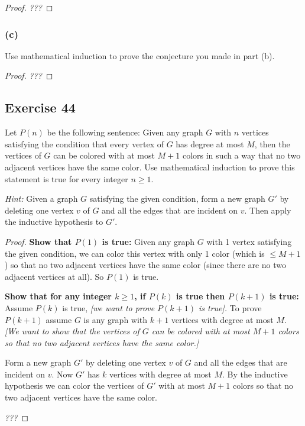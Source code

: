 \documentclass[14pt]{extarticle}
\begin{document}
\begin{proof}
    {\it ???}
\end{proof}

\subsubsection{(c)}
Use mathematical induction to prove the conjecture you made in part (b).

\begin{proof}
    {\it ???}
\end{proof}

\subsection{Exercise 44}
Let $P(n)$ be the following sentence: Given any graph $G$ with $n$ vertices satisfying the condition that every vertex of $G$ has degree at most $M$, then the vertices of $G$ can be colored with at most $M + 1$ colors in such a way that no two adjacent vertices have the same color. Use mathematical induction to prove this statement is true for every integer $n \geq 1$.

    {\it Hint:} Given a graph $G$ satisfying the given condition, form a new graph $G'$ by deleting one vertex $v$ of $G$ and all the edges that are incident on $v$. Then apply the inductive hypothesis to $G'$.

\begin{proof}
    {\bf Show that $P(1)$ is true:} Given any graph $G$ with 1 vertex satisfying the given condition, we can color this vertex with only 1 color (which is $\leq M+1$) so that no two adjacent vertices have the same color (since there are no two adjacent vertices at all). So $P(1)$ is true.

        {\bf Show that for any integer $k \geq 1$, if $P(k)$ is true then $P(k+1)$ is true:} Assume $P(k)$ is true, {\it [we want to prove $P(k+1)$ is true].} To prove $P(k+1)$ assume $G$ is any graph with $k+1$ vertices with degree at most $M$. {\it [We want to show that the vertices of $G$ can be colored with at most $M+1$ colors so that no two adjacent vertices have the same color.]}


    Form a new graph $G'$ by deleting one vertex $v$ of $G$ and all the edges that are incident on $v$. Now $G'$ has $k$ vertices with degree at most $M$. By the inductive hypothesis we can color the vertices of $G'$ with at most $M+1$ colors so that no two adjacent vertices have the same color.

        {\it ???}
\end{proof}
\end{document}
